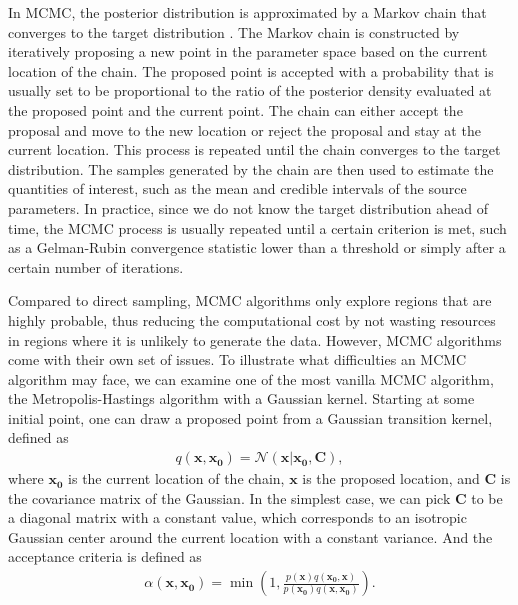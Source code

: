 \documentclass[twocolumn]{aastex631}
\begin{document}
In MCMC, the posterior distribution is approximated by a Markov chain that
converges to the target distribution \cite{10.1214/aos/1176325750}. The Markov
chain is constructed by iteratively proposing a new point in the parameter space
based on the current location of the chain. The proposed point is accepted with
a probability that is usually set to be proportional to the ratio of the
posterior density evaluated at the proposed point and the current point. The
chain can either accept the proposal and move to the new location or reject the
proposal and stay at the current location. This process is repeated until the
chain converges to the target distribution. The samples generated by the chain
are then used to estimate the quantities of interest, such as the mean and
credible intervals of the source parameters. In practice, since we do not know
the target distribution ahead of time, the MCMC process is usually repeated
until a certain criterion is met, such as a Gelman-Rubin convergence statistic
\cite{10.2307/2246093} lower than a threshold or simply after a certain number
of iterations.

Compared to direct sampling, MCMC algorithms only explore regions that are
highly probable, thus reducing the computational cost by not wasting resources in
regions where it is unlikely to generate the data. However, MCMC algorithms come
with their own set of issues. To illustrate what difficulties an MCMC algorithm
may face, we can examine one of the most vanilla MCMC algorithm, the
Metropolis-Hastings algorithm with a Gaussian kernel. Starting at some initial
point, one can draw a proposed point from a Gaussian transition kernel, defined
as
\begin{align}
    q(\mathbf{x},\mathbf{x_0})= \mathcal{N}(\mathbf{x}|\mathbf{x_0},\mathbf{C}),
\end{align}
where $\mathbf{x_0}$ is the current location of the chain, $\mathbf{x}$ is the
proposed location, and $\mathbf{C}$ is the covariance matrix of the Gaussian. In
the simplest case, we can pick $\mathbf{C}$ to be a diagonal matrix with a
constant value, which corresponds to an isotropic Gaussian center around the
current location with a constant variance. And the acceptance criteria is
defined as
\begin{align}
\alpha(\mathbf{x},\mathbf{x_0}) = \min\left(1,\frac{p(\mathbf{x})q(\mathbf{x_0},\mathbf{x})}{p(\mathbf{x_0})q(\mathbf{x},\mathbf{x_0})}\right).
\label{eq:Gaussian_acceptance}
\end{align}
\end{document}
